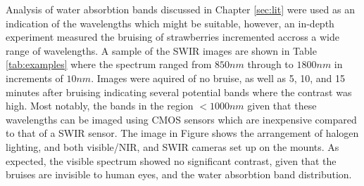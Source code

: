 \documentclass[fleqn,twoside,12pt]{report}
\begin{document}
Analysis of water absorbtion bands discussed in Chapter \ref{sec:lit} were used as an indication of the wavelengths which might be suitable, however, an in-depth experiment measured the bruising of strawberries incremented accross a wide range of wavelengths. A sample of the SWIR images are shown in Table \ref{tab:examples} where the spectrum ranged from $850nm$ through to $1800nm$ in increments of $10nm$. Images were aquired of no bruise, as well as 5, 10, and 15 minutes after bruising indicating several potential bands where the contrast was high. Most notably, the bands in the region $<1000nm$ given that these wavelengths can be imaged using CMOS sensors which are inexpensive compared to that of a SWIR sensor. The image in Figure shows the arrangement of halogen lighting, and both visible/NIR, and SWIR cameras set up on the mounts. As expected, the visible spectrum showed no significant contrast, given that the bruises are invisible to human eyes, and the water absorbtion band distribution.
\end{document}
